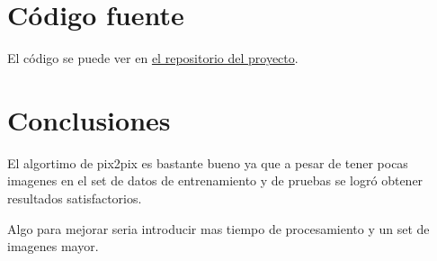 \documentclass[10pt,journal,compsoc]{IEEEtran}\usepackage[T1]{fontenc}                              %
\begin{document}
\section{Código fuente}

El código se puede ver en \href{https://github.com/penserbjorne/face2face}{el repositorio del proyecto}.

\section{Conclusiones}
El algortimo de pix2pix es bastante bueno ya que a pesar de tener pocas imagenes en el set de datos de entrenamiento y de pruebas se logró obtener resultados satisfactorios. 

Algo para mejorar seria introducir mas tiempo de procesamiento y un set de imagenes mayor.


%
%
%
\end{document}

